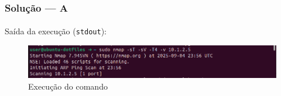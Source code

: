 \documentclass[12pt]{article}
\begin{document}
\subsubsection{Solução --- \textbf{A}}

\paragraph{}Saída da execução (\texttt{stdout}):

\begin{figure}[h!]
\centerline{\includegraphics[totalheight=1.5cm]{nmap-1.png}}
  \caption{Execução do comando}
  \label{fig:nmap2}
\end{figure}
\end{document}
